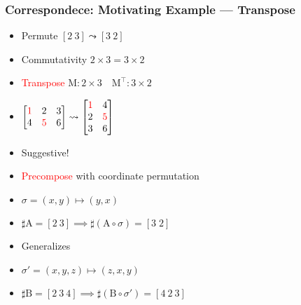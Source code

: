 \documentclass[xetex,mathserif,serif]{beamer}
\newcommand\mrm[1]{\mathrm{#1}}
\newcommand\brm[1]{\bm{\mrm{#1}}}
\newcommand\NB[1]{\textcolor{red}{#1}}
\begin{document}
\begin{frame}
  \frametitle{Correspondece: Motivating Example --- Transpose}
  \begin{itemize}%
    \item Permute \([2\ 3] \leadsto [3\ 2]\)
    \item Commutativity \(2\times3 = 3\times2\)
    \item \NB{Transpose} \(\brm M : 2\times3\quad \brm M^\intercal : 3\times2\)
    \item \(
      \begin{bmatrix}
        \NB 1 & 2 & 3 \\
        4 & \NB 5 & 6
      \end{bmatrix} \leadsto
      \begin{bmatrix}
        \NB 1 & 4 \\
        2 & \NB 5 \\
        3 & 6
      \end{bmatrix}
      \)
    \item Suggestive!
    \item \NB{Precompose} with coordinate permutation
    \item \(\sigma = (x, y) \mapsto (y, x)\)
    \item \(\sharp \brm A = [2\ 3] \implies \sharp(\brm A \circ \sigma) = [3\;2]\) 
    \item Generalizes
    \item \(\sigma' = (x, y, z) \mapsto (z, x, y)\)
    \item \(\sharp \brm B = [2\ 3\ 4] \implies \sharp(\brm B \circ \sigma') = [4\ 2\ 3]\) 
  \end{itemize}
\end{frame}
\end{document}
